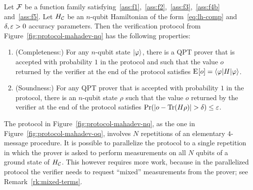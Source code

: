 \begin{theorem}\label{thm:mahadev-nq}
Let $\mathcal{F}$ be a function family satisfying~\ref{ass:f1},~\ref{ass:f2},~\ref{ass:f3},~\ref{ass:f4b} and~\ref{ass:f5}. 
Let $H_{\mathcal{C}}$ be an $n$-qubit Hamiltonian of the form~\eqref{eq:lh-comp} and $\delta,\varepsilon>0$ accuracy parameters. Then the verification protocol from Figure~\ref{fig:protocol-mahadev-nq} has the following properties:
\begin{enumerate}
\item (Completeness:) For any $n$-qubit state $|\varphi\rangle$, there is a QPT prover that is accepted with probability $1$ in the protocol and such that the value $o$ returned by the verifier at the end of the protocol satisfies $\textsc{E}_{}[o] = \langle\varphi| H |\varphi\rangle$.
\item (Soundness:) For any QPT prover that is accepted with probability  $1$ in the protocol, there is an $n$-qubit state $\rho$ such that the value $o$ returned by the verifier at the end of the protocol satisfies  $\Pr(|o-\mbox{\rm Tr}(H\rho)| > \delta)\leq \varepsilon$.
\end{enumerate}
\end{theorem}

\begin{remark}
The protocol in Figure~\ref{fig:protocol-mahadev-nq}, as the one in Figure~\ref{fig:protocol-mahadev-oq}, involves $N$ repetitions of an elementary $4$-message procedure. It is possible to parallelize the protocol to a single repetition in which the prover is asked to perform measurements on all $N$ qubits of a ground state of $H_{\mathcal{C}}$. This however requires more work, because in the parallelized protocol the verifier needs to request ``mixed'' measurements from the prover; see Remark~\ref{rk:mixed-terms}. 
\end{remark}

